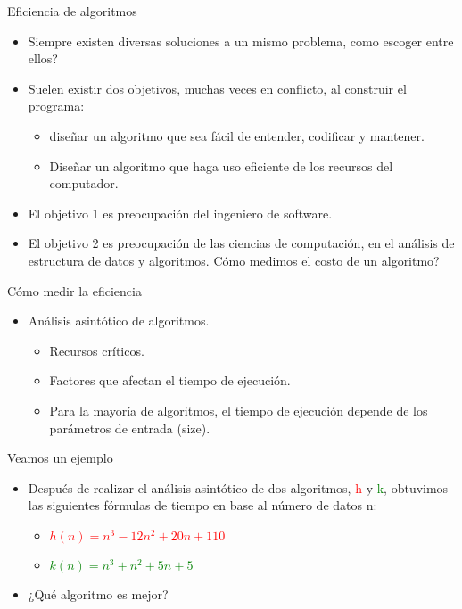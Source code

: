 \documentclass[aspectratio=169]{beamer}
\begin{document}
\begin{frame}{Eficiencia de algoritmos}
  \begin{itemize}
    \item Siempre existen diversas soluciones a un mismo problema, como escoger entre ellos?
    \item Suelen existir dos objetivos, muchas veces en conflicto, al construir el programa:
    \begin{itemize}
      \item diseñar un algoritmo que sea fácil de entender, codificar y mantener.
      \item Diseñar un algoritmo que haga uso eficiente de los recursos del computador.
    \end{itemize}
    \item El objetivo 1 es preocupación del ingeniero de software.
    \item El objetivo 2 es preocupación de las ciencias de computación, en el análisis de estructura de datos y algoritmos. Cómo medimos el costo de un algoritmo?
  \end{itemize}
\end{frame}

\begin{frame}{Cómo medir la eficiencia}
  \begin{itemize}
    \item Análisis asintótico de algoritmos.
    \begin{itemize}
      \item Recursos críticos.
      \item Factores que afectan el tiempo de ejecución.
      \item Para la mayoría de algoritmos, el tiempo de ejecución depende de los parámetros de entrada (size).
    \end{itemize}
  \end{itemize}
\end{frame}

\begin{frame}{Veamos un ejemplo}
  \begin{itemize}
    \item Después de realizar el análisis asintótico de dos algoritmos, \textcolor{red}{h} y \textcolor{green}{k}, obtuvimos las siguientes fórmulas de tiempo en base al número de datos n:
    \begin{itemize}
      \item \textcolor{red}{$h(n) = n^3 - 12n^2 + 20n + 110$}
      \item \textcolor{green}{$k(n) = n^3 + n^2 + 5n + 5$}
    \end{itemize}
    \item ¿Qué algoritmo es mejor?
  \end{itemize}
\end{frame}
\end{document}
